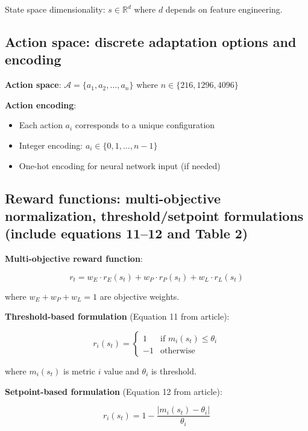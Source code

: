 \documentclass[11pt,a4paper]{article}
\begin{document}
State space dimensionality: $s \in \mathbb{R}^d$ where $d$ depends on feature engineering.

\subsection{Action space: discrete adaptation options and encoding}

\textbf{Action space}: $\mathcal{A} = \{a_1, a_2, \ldots, a_n\}$ where $n \in \{216, 1296, 4096\}$

\textbf{Action encoding}:
\begin{itemize}
    \item Each action $a_i$ corresponds to a unique configuration
    \item Integer encoding: $a_i \in \{0, 1, \ldots, n-1\}$
    \item One-hot encoding for neural network input (if needed)
\end{itemize}

\subsection{Reward functions: multi-objective normalization, threshold/setpoint formulations (include equations 11--12 and Table 2)}

\textbf{Multi-objective reward function}:

\begin{equation}
r_t = w_E \cdot r_E(s_t) + w_P \cdot r_P(s_t) + w_L \cdot r_L(s_t)
\end{equation}

where $w_E + w_P + w_L = 1$ are objective weights.

\textbf{Threshold-based formulation} (Equation 11 from article):

\begin{equation}
r_i(s_t) = \begin{cases}
1 & \text{if } m_i(s_t) \leq \theta_i \\
-1 & \text{otherwise}
\end{cases}
\end{equation}

where $m_i(s_t)$ is metric $i$ value and $\theta_i$ is threshold.

\textbf{Setpoint-based formulation} (Equation 12 from article):

\begin{equation}
r_i(s_t) = 1 - \frac{|m_i(s_t) - \theta_i|}{\theta_i}
\end{equation}
\end{document}

